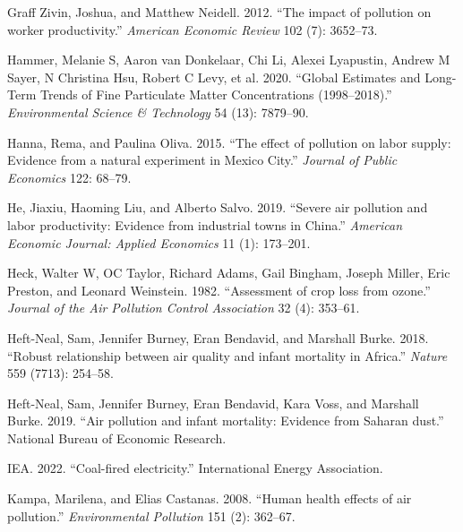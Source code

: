 \documentclass[
]{article}
\newlength{\cslhangindent}
\newlength{\cslentryspacingunit} %
\newenvironment{CSLReferences}[2] %
 {%
  \setlength{\parindent}{0pt}
  \ifodd #1
  \let\oldpar\par
  \def\par{\hangindent=\cslhangindent\oldpar}
  \fi
  \setlength{\parskip}{#2\cslentryspacingunit}
 }%
 {}
\begin{document}
\begin{CSLReferences}{1}{0}
\leavevmode{}%
Graff Zivin, Joshua, and Matthew Neidell. 2012. {``{The impact of pollution on worker productivity}.''} \emph{{American Economic Review}} 102 (7): 3652--73.

\leavevmode{}%
Hammer, Melanie S, Aaron van Donkelaar, Chi Li, Alexei Lyapustin, Andrew M Sayer, N Christina Hsu, Robert C Levy, et al. 2020. {``Global Estimates and Long-Term Trends of Fine Particulate Matter Concentrations (1998--2018).''} \emph{{Environmental Science \& Technology}} 54 (13): 7879--90.

\leavevmode{}%
Hanna, Rema, and Paulina Oliva. 2015. {``{The effect of pollution on labor supply: Evidence from a natural experiment in Mexico City}.''} \emph{{Journal of Public Economics}} 122: 68--79.

\leavevmode{}%
He, Jiaxiu, Haoming Liu, and Alberto Salvo. 2019. {``{Severe air pollution and labor productivity: Evidence from industrial towns in China}.''} \emph{{American Economic Journal: Applied Economics}} 11 (1): 173--201.

\leavevmode{}%
Heck, Walter W, OC Taylor, Richard Adams, Gail Bingham, Joseph Miller, Eric Preston, and Leonard Weinstein. 1982. {``{Assessment of crop loss from ozone}.''} \emph{{Journal of the Air Pollution Control Association}} 32 (4): 353--61.

\leavevmode{}%
Heft-Neal, Sam, Jennifer Burney, Eran Bendavid, and Marshall Burke. 2018. {``{Robust relationship between air quality and infant mortality in Africa}.''} \emph{Nature} 559 (7713): 254--58.

\leavevmode{}%
Heft-Neal, Sam, Jennifer Burney, Eran Bendavid, Kara Voss, and Marshall Burke. 2019. {``{Air pollution and infant mortality: Evidence from Saharan dust}.''} {National Bureau of Economic Research}.

\leavevmode{}%
IEA. 2022. {``{Coal-fired electricity}.''} {International Energy Association}.

\leavevmode{}%
Kampa, Marilena, and Elias Castanas. 2008. {``{Human health effects of air pollution}.''} \emph{{Environmental Pollution}} 151 (2): 362--67.


\end{CSLReferences}
\end{document}
